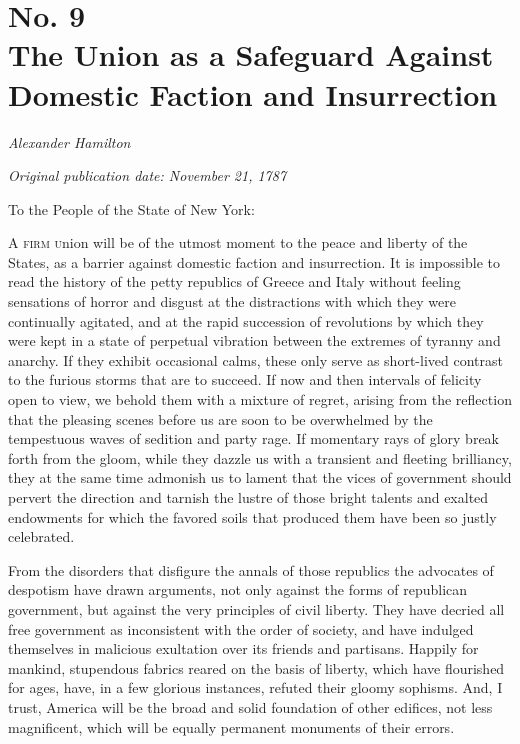 \chapter[No. 9: The Union as a Safeguard Against Domestic Faction and Insurrection]{No. 9\\ {\small The Union as a Safeguard Against Domestic Faction and Insurrection}}

\textit{Alexander Hamilton}

\textit{Original publication date: November 21, 1787}
\vspace{1cm}

To the People of the State of New York:
\vspace{.4cm}

\textsc{A firm u}nion will be of the utmost moment to the peace and liberty of the States, as a barrier against domestic faction and insurrection. 
It is impossible to read the history of the petty republics of Greece and Italy without feeling sensations of horror and disgust at the distractions with which they were continually agitated, and at the rapid succession of revolutions by which they were kept in a state of perpetual vibration between the extremes of tyranny and anarchy. 
If they exhibit occasional calms, these only serve as short-lived contrast to the furious storms that are to succeed. 
If now and then intervals of felicity open to view, we behold them with a mixture of regret, arising from the reflection that the pleasing scenes before us are soon to be overwhelmed by the tempestuous waves of sedition and party rage. 
If momentary rays of glory break forth from the gloom, while they dazzle us with a transient and fleeting brilliancy, they at the same time admonish us to lament that the vices of government should pervert the direction and tarnish the lustre of those bright talents and exalted endowments for which the favored soils that produced them have been so justly celebrated.

From the disorders that disfigure the annals of those republics the advocates of despotism have drawn arguments, not only against the forms of republican government, but against the very principles of civil liberty. 
They have decried all free government as inconsistent with the order of society, and have indulged themselves in malicious exultation over its friends and partisans. 
Happily for mankind, stupendous fabrics reared on the basis of liberty, which have flourished for ages, have, in a few glorious instances, refuted their gloomy sophisms. 
And, I trust, America will be the broad and solid foundation of other edifices, not less magnificent, which will be equally permanent monuments of their errors.


